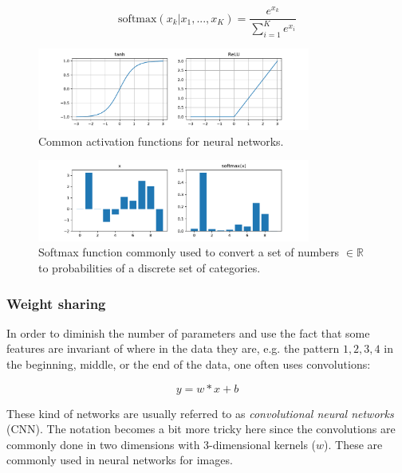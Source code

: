 \begin{equation}
    \text{softmax}(x_k|x_1, ..., x_K) = \frac{e^{x_k}}{\sum_{i=1}^K e^{x_i}}
\end{equation}

\begin{figure}[h]
    \centering
    \includegraphics[width=0.8\textwidth]{res/relu_tanh.pdf}

    \caption{Common activation functions for neural networks.}

    \label{fig:tanh_relu}
\end{figure}

\begin{figure}[h]
    \centering
    \includegraphics[width=0.8\textwidth]{res/softmax.pdf}

    \caption{Softmax function commonly used to convert a set of numbers $\in \mathbb{R}$ to probabilities of a discrete set of categories.}

    \label{fig:softmax}
\end{figure}

\subsubsection{Weight sharing}
In order to diminish the number of parameters and use the fact that some features are invariant of where in the data they are,
e.g. the pattern $1, 2, 3, 4$ in the beginning, middle, or the end of the data, one often uses convolutions:

\begin{equation}
    y = w * x + b
\end{equation}

These kind of networks are usually referred to as \textit{convolutional neural
networks} (CNN). The notation becomes a bit more tricky here since the
convolutions are commonly done in two dimensions with 3-dimensional kernels
($w$). These are commonly used in neural networks for images.

